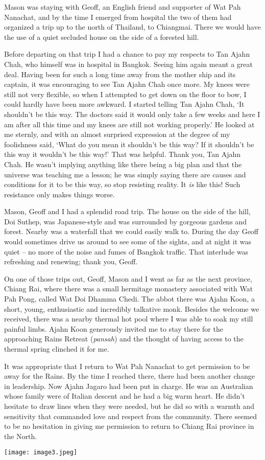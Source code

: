 Mason was staying with Geoff, an English friend and supporter of Wat Pah
Nanachat, and by the time I emerged from hospital the two of them had
organized a trip up to the north of Thailand, to Chiangmai. There we
would have the use of a quiet secluded house on the side of a forested
hill.

Before departing on that trip I had a chance to pay my respects to Tan
Ajahn Chah, who himself was in hospital in Bangkok. Seeing him again
meant a great deal. Having been for such a long time away from the
mother ship and its captain, it was encouraging to see Tan Ajahn Chah
once more. My knees were still not very flexible, so when I attempted to
get down on the floor to bow, I could hardly have been more awkward. I
started telling Tan Ajahn Chah, `It shouldn't be this way. The doctors
said it would only take a few weeks and here I am after all this time
and my knees are still not working properly.' He looked at me sternly,
and with an almost surprised expression at the degree of my foolishness
said, `What do you mean it shouldn't be this way? If it shouldn't be
this way it wouldn't be this way!' That was helpful. Thank you, Tan
Ajahn Chah. He wasn't implying anything like there being a big plan and
that the universe was teaching me a lesson; he was simply saying there
are causes and conditions for it to be this way, so stop resisting
reality. It \emph{is} like this! Such resistance only makes things
worse.

Mason, Geoff and I had a splendid road trip. The house on the side of
the hill, Doi Suthep, was Japanese-style and was surrounded by gorgeous
gardens and forest. Nearby was a waterfall that we could easily walk to.
During the day Geoff would sometimes drive us around to see some of the
sights, and at night it was quiet -- no more of the noise and fumes of
Bangkok traffic. That interlude was refreshing and renewing; thank you,
Geoff.

On one of those trips out, Geoff, Mason and I went as far as the next
province, Chiang Rai, where there was a small hermitage monastery
associated with Wat Pah Pong, called Wat Doi Dhamma Chedi. The abbot
there was Ajahn Koon, a short, young, enthusiastic and incredibly
talkative monk. Besides the welcome we received, there was a nearby
thermal hot pool where I was able to soak my still painful limbs. Ajahn
Koon generously invited me to stay there for the approaching Rains
Retreat (\emph{pansah}) and the thought of having access to the thermal
spring clinched it for me.

It was appropriate that I return to Wat Pah Nanachat to get permission
to be away for the Rains. By the time I reached there, there had been
another change in leadership. Now Ajahn Jagaro had been put in charge.
He was an Australian whose family were of Italian descent and he had a
big warm heart. He didn't hesitate to draw lines when they were needed,
but he did so with a warmth and sensitivity that commanded love and
respect from the community. There seemed to be no hesitation in giving
me permission to return to Chiang Rai province in the North.

\texttt{[image: image3.jpeg]}

